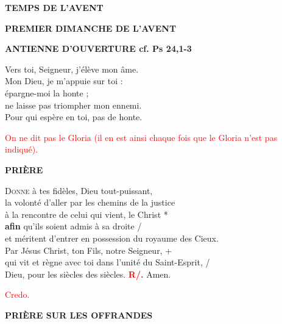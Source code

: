 \documentclass[12pt]{article}
\begin{document}
\begin{center}
\textbf{\LARGE TEMPS DE L’AVENT}

\vspace{0.3em}
\textbf{\large PREMIER DIMANCHE DE L’AVENT}
\end{center}

\vspace{1em}

\textbf{\textcolor{rougeliturgique}{ANTIENNE D’OUVERTURE} \textnormal{cf. Ps 24,1-3}}

Vers toi, Seigneur, j’élève mon âme.\\
Mon Dieu, je m’appuie sur toi :\\
\hspace*{1em} épargne-moi la honte ;\\
\hspace*{1em} ne laisse pas triompher mon ennemi.\\
Pour qui espère en toi, pas de honte.

\vspace{0.5em}
{\small \textcolor{red}{On ne dit pas le Gloria (il en est ainsi chaque fois que le Gloria n’est pas indiqué).}}

\vspace{1em}
\textbf{\textcolor{rougeliturgique}{PRIÈRE}}

\lettrine[lines=2, lhang=0.1, loversize=0.2, findent=0pt, nindent=0pt]{\color{red}D}{onne} à tes fidèles, Dieu tout-puissant,\\
la volonté d’aller par les chemins de la justice\\
à la rencontre de celui qui vient, le Christ *\\
\textbf{afin} qu’ils soient admis à sa droite /\\
\hspace*{1em}et méritent d’entrer en possession du royaume des Cieux.\\
Par Jésus Christ, ton Fils, notre Seigneur, +\\
\hspace*{1em}qui vit et règne avec toi dans l’unité du Saint-Esprit, /\\
\hspace*{1em}Dieu, pour les siècles des siècles.
\textbf{\textcolor{red}{R/.}} Amen.

{\small \textcolor{red}{Credo.}}

\vspace{1em}
\textbf{\textcolor{rougeliturgique}{PRIÈRE SUR LES OFFRANDES}}
\end{document}
